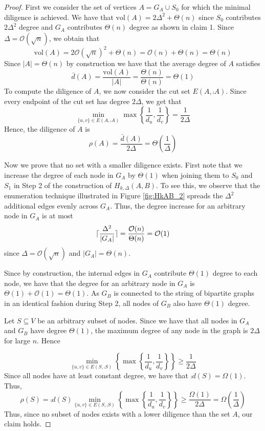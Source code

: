 \begin{proof}
	First we consider the set of vertices $A = G_A \cup S_0$ for which the minimal diligence is achieved.
	We have that $\text{vol}(A) = 2\Delta^2 + \Theta(n)$ since $S_0$ contributes $2\Delta^2$ degree and $G_A$ contributes $\Theta(n)$ degree as shown in claim 1. Since $\Delta = \mathcal{O}(\sqrt{n})$, we obtain that 
	$$
		\text{vol}(A) = 2 \mathcal{O}(\sqrt{n})^2 + \Theta(n) = \mathcal{O}(n) + \Theta(n) = \Theta(n)
	$$ 
	Since $|A| = \Theta(n)$ by construction we have that the average degree of $A$ satisfies $$
		\bar{d}(A) = \frac{\text{vol}(A)}{|A|} = \frac{\Theta(n)}{\Theta(n)} = \Theta(1)
	$$
	To compute the diligence of $A$, we now consider the cut set $E(A, \comp{A})$. Since every endpoint of the cut set has degree $2\Delta$, we get that 
	$$
		\min_{\{u, v\} \in E(A, \comp{A})} \max \left\{ \frac{1}{d_u}, \frac{1}{d_v} \right\} = \frac{1}{2\Delta}
	$$
	Hence, the diligence of $A$ is 
	$$
		\rho(A) = \frac{\bar{d}(A)}{2\Delta} = \Theta\left(\frac{1}{\Delta}\right)
	$$ 
	
	Now we prove that no set with a smaller diligence exists. First note that we increase the degree of each node in $G_A$ by $\Theta(1)$ when joining them to $S_0$ and $S_1$ in Step 2 of the construction of $H_{k, \Delta}(A,B)$. To see this, we observe that the enumeration technique illustrated in Figure \ref{fig:HkAB_2} spreads the $\Delta^2$ additional edges evenly across $G_A$. Thus, the degree increase for an arbitrary node in $G_A$ is at most
	$$
		\lceil\frac{\Delta^2}{|G_A|}\rceil=\frac{\mathcal{O}(n)}{\Theta(n)} = \mathcal{O}(1)
	$$
	since $\Delta = \mathcal{O}(\sqrt{n})$ and $|G_A| = \Theta(n)$. 
	
	Since by construction, the internal edges in $G_A$ contribute $\Theta(1)$ degree to each node, we have that the degree for an arbitrary node in $G_A$ is $\Theta(1) + \mathcal{O}(1) = \Theta(1)$. As $G_B$ is connected to the string of bipartite graphs in an identical fashion during Step 2, all nodes of $G_B$ also have $\Theta(1)$ degree.  
	
	Let $S \subseteq V$ be an arbitrary subset of nodes. Since we have that all nodes in $G_A$ and $G_B$ have degree $\Theta(1)$, the maximum degree of any node in the graph is $2\Delta$ for large $n$. Hence 

	$$
	\min_{\{u, v\} \in E(S, \comp{S}) } \left\{ \max \left\{ \frac{1}{d_u},\frac{1}{d_v} \right\} \right\} \geq \frac{1}{2\Delta}
	$$
	Since all nodes have at least constant degree, we have that $\comp{d}(S) = \Omega(1)$. Thus, 
	$$
		\rho(S) 
		= \comp{d}(S) \min_{\{u, v\} \in E(S, \comp{S}) } \left\{ \max \left\{ \frac{1}{d_u},\frac{1}{d_v} \right\} \right\}
		\geq \frac{\Omega(1)}{2\Delta}
		= \Omega\left(\frac{1}{\Delta}\right)
	$$
	Thus, since no subset of nodes exists with a lower diligence than the set $A$, our claim holds.


\end{proof}
